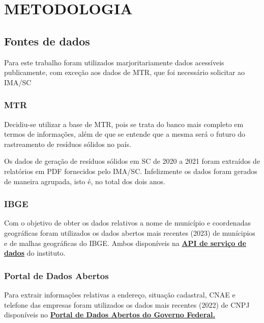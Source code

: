 \chapter{METODOLOGIA}

\section{Fontes de dados}\label{section:Fontes}

Para este trabalho foram utilizados marjoritariamente dados acessíveis publicamente, com exceção aos dados de \gls{MTR}, que foi necessário solicitar ao \gls{IMA/SC}

\subsection{MTR}

Decidiu-se utilizar a base de MTR, pois se trata do banco mais completo em termos de informações, além de que se entende que a mesma será o futuro do rastreamento de resíduos sólidos no país.

Os dados de geração de resíduos sólidos em \gls{SC} de 2020 a 2021 foram extraídos de relatórios em \gls{PDF} fornecidos pelo \gls{IMA/SC}. Infelizmente os dados foram gerados de maneira agrupada, isto é, no total dos dois anos.

\subsection{IBGE}

Com o objetivo de obter os dados relativos a nome de município e coordenadas geográficas foram utilizados os dados abertos mais recentes (2023) de munícipios e de malhas geográficas do \gls{IBGE}. Ambos disponíveis na \href{https://servicodados.ibge.gov.br/api/docs/}{\textbf{\gls{API} de serviço de dados}} do instituto.

\subsection{Portal de Dados Abertos}

Para extrair informações relativas a endereço, situação cadastral, \gls{CNAE} e telefone das empresas foram utilizados os dados mais recentes (2022) de \gls{CNPJ} disponíveis no \href{https://dados.gov.br/dados/conjuntos-dados/cadastro-nacional-da-pessoa-juridica---cnpj}{\textbf{Portal de Dados Abertos do Governo Federal.}}

